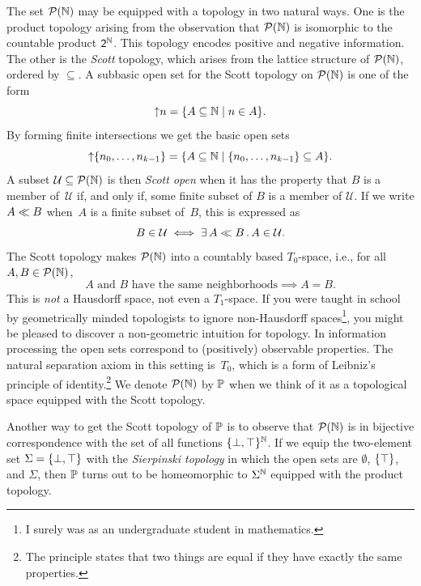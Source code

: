 The set $\mathcal{P}(\mathbb{N})$ may be equipped with a topology in two natural
ways. One is the product topology arising from the observation that
$\mathcal{P}(\mathbb{N})$ is isomorphic to the countable product $\mathsf{2}^{\mathbb{N}}$. This
topology encodes positive and negative information. The other is the
\emph{Scott} topology, which arises from the lattice structure of
$\mathcal{P}(\mathbb{N})$, ordered by $\subseteq$. A subbasic open set for the Scott
topology on $\mathcal{P}(\mathbb{N})$ is one of the form
%
\begin{equation*}
  {\uparrow}n = \{A \subseteq \mathbb{N} \mid n \in A\}.
\end{equation*}
%
By forming finite intersections we get the basic open sets
%
\begin{equation*}
  {\uparrow}\{n_0, \ldots, n_{k-1}\} =
  \{A \subseteq \mathbb{N} \mid \{n_0, \ldots, n_{k-1}\} \subseteq A\}.
\end{equation*}
%
A subset $\mathcal{U} \subseteq \mathcal{P}(\mathbb{N})$ is then \emph{Scott open}
when it has the property that $B$ is a member of~$\mathcal{U}$ if, and
only if, some finite subset of $B$ is a member of $\mathcal{U}$. If we
write $A \ll B$ when~$A$ is a finite subset of~$B$, this is
expressed as
%
\begin{equation*}
  B \in \mathcal{U} \iff \exists\, A \ll B\,.\,A \in \mathcal{U}.
\end{equation*}
%
The Scott topology makes $\mathcal{P}(\mathbb{N})$ into a countably based
$T_0$-space, i.e., for all $A, B \in \mathcal{P}(\mathbb{N})$,
%
\begin{equation*}
  \text{$A$ and $B$ have the same neighborhoods} \implies A = B.
\end{equation*}
%
This is \emph{not} a Hausdorff space, not even a $T_1$-space. If you
were taught in school by geometrically minded topologists to ignore
non-Hausdorff spaces\footnote{I surely was as an undergraduate student
  in mathematics.}, you might be pleased to discover a non-geometric
intuition for topology. In information processing the open sets
correspond to (positively) observable properties. The natural
separation axiom in this setting is~$T_0$, which is a form of
Leibniz's principle of identity.\footnote{The principle states that
  two things are equal if they have exactly the same properties.} We
denote $\mathcal{P}(\mathbb{N})$ by $\mathbb{P}$ when we think of it as a topological
space equipped with the Scott topology.

Another way to get the Scott topology of $\mathbb{P}$ is to observe that
$\mathcal{P}(\mathbb{N})$ is in bijective correspondence with the set of all
functions $\{\bot, \top\}^{\mathbb{N}}$. If we equip the two-element set
$\Sigma = \{\bot, \top\}$ with the \emph{Sierpinski topology} in
which the open sets are $\emptyset$, $\{\top\}$, and $\Sigma$, then
$\mathbb{P}$ turns out to be homeomorphic to $\Sigma^{\mathbb{N}}$ equipped with
the product topology.


